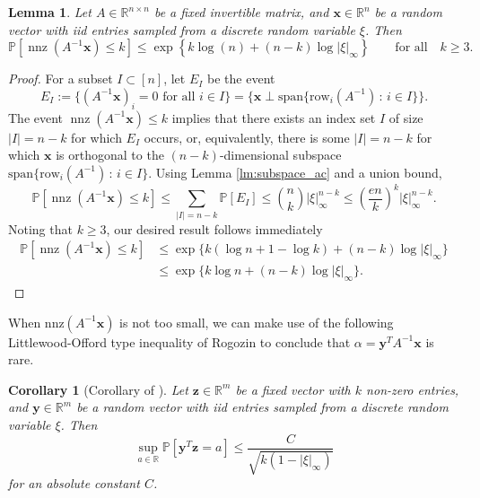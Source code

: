 \documentclass[reqno]{amsart}
\numberwithin{equation}{section}
\newtheorem{lemma}[theorem]{Lemma}
\newtheorem{corollary}[theorem]{Corollary}
\begin{document}
\begin{lemma}
Let $A \in \mathbb{R}^{n \times n}$ be a fixed invertible matrix, and $\bm{x} \in \mathbb{R}^{n}$ be a random vector with iid entries sampled from a discrete random variable $\xi$. Then
\[
\mathbb{P}\left[\operatorname{nnz}(A^{-1} \bm{x}) \le k \right] \le \exp\left\{k\log(n) +(n-k) \log |\xi|_\infty \right\} \qquad \text{for all} \quad k \ge 3.
\]
\end{lemma}\label{lm:sparse_rare}
\begin{proof}
For a subset $I \subset [n]$, let $E_I$ be the event
\[
E_I := \{(A^{-1} \bm{x})_i = 0 \text{ for all } i \in I\} = \{\bm{x} \perp \mathrm{span}\{\mathrm{row}_i(A^{-1})\, :\, i \in I \} \}.
\]
The event $\operatorname{nnz}(A^{-1} \bm{x}) \le k$ implies that there exists an index set $I$ of size $|I| = n-k$ for which $E_I$ occurs, or, equivalently, there is some $|I| = n-k$ for which $\bm{x}$ is orthogonal to the $(n-k)$-dimensional subspace $\mathrm{span}\{\mathrm{row}_i(A^{-1})\, :\, i \in I \}$. Using Lemma \ref{lm:subspace_ac} and a union bound,
\[
\mathbb{P}\left[\operatorname{nnz}(A^{-1} \bm{x}) \le k \right] \le \sum_{|I|=n-k} \mathbb{P}\left[E_I\right] \le \binom{n}{k} |\xi|_\infty^{n-k} \le  \left(\frac{en}{k}\right)^{k} |\xi|_\infty^{n-k}.
\]
Noting that $k \ge 3$, our desired result follows immediately
\begin{align*}  \mathbb{P}\left[\operatorname{nnz}(A^{-1} \bm{x}) \le k \right] &\le \exp\{k(\log n + 1 - \log k) + (n-k) \log |\xi|_\infty\} \\
     &\le  \exp\{k \log n + (n-k) \log |\xi|_\infty\}.
\end{align*} 
\end{proof}

When $\mathrm{nnz}(A^{-1} \bm{x})$ is not too small, we can make use of the following Littlewood-Offord type inequality of Rogozin to conclude that $\alpha = \bm{y}^TA^{-1} \bm{x}$ is rare.

\begin{corollary}[Corollary of {\cite[Theorem 2]{rogozin1961estimate}}]\label{cor:rogozin}
Let $\bm{z} \in \mathbb{R}^m$ be a fixed vector with $k$ non-zero entries, and $\bm{y} \in \mathbb{R}^{m}$ be a random vector with iid entries sampled from a discrete random variable $\xi$. Then
\[\sup_{a \in \mathbb{R}} \mathbb{P}\left[ \bm{y}^T \bm{z} = a \right] \le \frac{C}{\sqrt{k(1-|\xi|_\infty)}}\]
for an absolute constant $C$.
\end{corollary}
\end{document}
